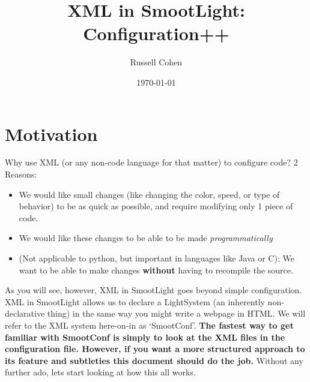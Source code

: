 \documentclass{article}
\begin{document}
    \title{XML in SmootLight: Configuration++}
    \author{Russell Cohen}
    \date{\today}
    \maketitle
    \section{Motivation}
        Why use XML (or any non-code language for that matter) to configure code?  2 Reasons: 
        \begin{itemize}
            \item We would like small changes (like changing the color, speed, or type of behavior)
            to be as quick as possible, and require modifying only 1 piece of code.
            \item We would like these changes to be able to be made \emph{programmatically}
            \item (Not applicable to python, but important in languages like Java or C): We want to
            be able to make changes \textbf{without} having to recompile the source.
        \end{itemize}
        As you will see, however, XML in SmootLight goes beyond simple configuration.  XML in
        SmootLight allows us to declare a LightSystem (an inherently non-declarative thing) in the
        same way you might write a webpage in HTML.  We will refer to the XML system here-on-in as
        `SmootConf'.  \textbf{The fastest way to get familiar with SmootConf is simply to look at
        the XML files in the configuration file.  However, if you want a more structured approach to
        its feature and subtleties this document should do the job.}  Without any further ado, lets start looking at
        how this all works.
\end{document}
